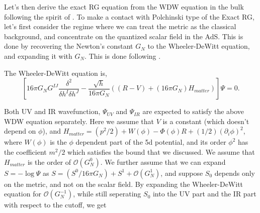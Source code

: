 \documentclass[12pt,epsbox]{article}
\numberwithin{equation}{section}
\begin{document}

Let's then derive the exact RG equation from the WDW equation in the bulk following the spirit of \cite{VV}. To make a contact with Polchinski type\cite{PolchinskiRG} of the Exact RG, let's first consider the regime where we can treat the metric as the classical background, and concentrate on the quantized scalar field in the AdS. This is done by recovering the Newton's constant $G_N$ to the Wheeler-DeWitt equation, and expanding it with $G_N$. This is done following \cite{GiladSchwinger}.

The Wheeler-DeWitt equation is,
\begin{equation}
\left[ 16 \pi G_N G^{IJ} \frac{\delta^2}{\delta h^I \delta h^J} - \frac{\sqrt{h}}{16\pi G_N} \left( (R-V) + (16\pi G_N) H_{matter} \right)  \right] \Psi=0.
\end{equation}

Both UV and IR wavefunction, $\Psi_{UV}$ and $\Psi_{IR}$ are expected to satisfy the above WDW equation separately.
Here we assume that $V$ is a constant (which doesn't depend on $\phi$), and $H_{matter}= (p^2/2) + W(\phi) -\Phi(\phi)R + (1/2)(\partial_i \phi)^2$, where $W(\phi)$ is the $\phi$ dependent part of the 5d potential, and its order $\phi^2$ has the coefficient $m^2/2$ which satisfies the bound that we discussed. We assume that $H_{matter}$ is the order of $\mathcal{O}(G_N^0)$. We further assume that we can expand
$S=-\log \Psi$ as $S=(S^0 / 16 \pi G_N) + S^1 + \mathcal{O}(G_N^1)$, and suppose $S_0$ depends only on the metric, and not on the scalar field. By expanding the Wheeler-DeWitt equation for $\mathcal{O}(G_N^{-1})$, while still seperating $S_0$ into the UV part and the IR part with respect to the cutoff, we get
\end{document}
